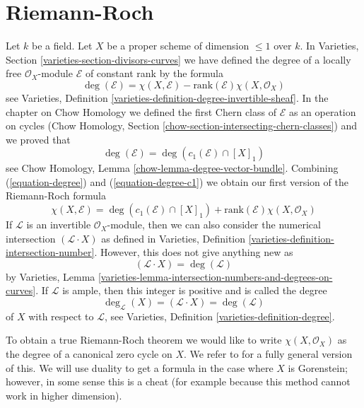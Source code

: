\section{Riemann-Roch}
\label{curves-section-Riemann-Roch}
Let $k$ be a field. Let $X$ be a proper scheme of dimension $\leq 1$
over $k$. In Varieties, Section \ref{varieties-section-divisors-curves}
we have defined the degree of a locally free $\mathcal{O}_X$-module
$\mathcal{E}$ of constant rank by the formula
\begin{equation}
\label{equation-degree}
\deg(\mathcal{E}) =
\chi(X, \mathcal{E}) - \text{rank}(\mathcal{E})\chi(X, \mathcal{O}_X)
\end{equation}
see Varieties, Definition \ref{varieties-definition-degree-invertible-sheaf}.
In the chapter on Chow Homology we defined the first Chern class of
$\mathcal{E}$ as an operation on cycles
(Chow Homology, Section
\ref{chow-section-intersecting-chern-classes}) and we proved that
\begin{equation}
\label{equation-degree-c1}
\deg(\mathcal{E}) = \deg(c_1(\mathcal{E}) \cap [X]_1)
\end{equation}
see Chow Homology, Lemma \ref{chow-lemma-degree-vector-bundle}.
Combining (\ref{equation-degree}) and (\ref{equation-degree-c1})
we obtain our first version of the Riemann-Roch formula
\begin{equation}
\label{equation-rr}
\chi(X, \mathcal{E}) =
\deg(c_1(\mathcal{E}) \cap [X]_1) +
\text{rank}(\mathcal{E})\chi(X, \mathcal{O}_X)
\end{equation}
If $\mathcal{L}$ is an invertible $\mathcal{O}_X$-module, then
we can also consider the numerical intersection
$(\mathcal{L} \cdot X)$ as defined in
Varieties, Definition \ref{varieties-definition-intersection-number}.
However, this does not give anything new as
\begin{equation}
\label{equation-numerical-degree}
(\mathcal{L} \cdot X) = \deg(\mathcal{L})
\end{equation}
by Varieties, Lemma
\ref{varieties-lemma-intersection-numbers-and-degrees-on-curves}. If
$\mathcal{L}$ is ample, then this integer is positive and is
called the degree
\begin{equation}
\label{equation-degree-X}
\deg_\mathcal{L}(X) = (\mathcal{L} \cdot X) = \deg(\mathcal{L})
\end{equation}
of $X$ with respect to $\mathcal{L}$, see
Varieties, Definition \ref{varieties-definition-degree}.

\medskip\noindent
To obtain a true Riemann-Roch theorem we would like to write
$\chi(X, \mathcal{O}_X)$ as the degree of a canonical zero cycle on $X$.
We refer to \cite{F} for a fully general version of this. We will use
duality to get a formula in the case where $X$ is Gorenstein; however,
in some sense this is a cheat (for example because this method cannot
work in higher dimension).

